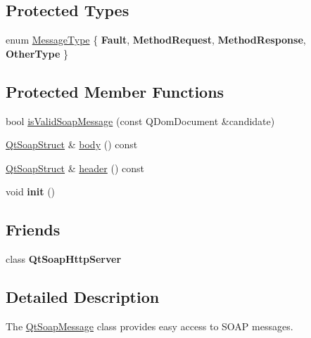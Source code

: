 \subsection*{Protected Types}
\begin{DoxyCompactItemize}
\item 
enum \mbox{\hyperlink{class_qt_soap_message_a57326237655d076b289452ce9ab3b8de}{Message\+Type}} \{ {\bfseries Fault}, 
{\bfseries Method\+Request}, 
{\bfseries Method\+Response}, 
{\bfseries Other\+Type}
 \}
\end{DoxyCompactItemize}
\subsection*{Protected Member Functions}
\begin{DoxyCompactItemize}
\item 
bool \mbox{\hyperlink{class_qt_soap_message_a2aa1fdeea09e733ac5fe103ece393b8a}{is\+Valid\+Soap\+Message}} (const Q\+Dom\+Document \&candidate)
\item 
\mbox{\hyperlink{class_qt_soap_struct}{Qt\+Soap\+Struct}} \& \mbox{\hyperlink{class_qt_soap_message_a8c5e1cc13af9a4aebfd6d061525a69f5}{body}} () const
\item 
\mbox{\hyperlink{class_qt_soap_struct}{Qt\+Soap\+Struct}} \& \mbox{\hyperlink{class_qt_soap_message_a4c1ec40db5502f9f54cadcafd4cdc772}{header}} () const
\item 
\mbox{\label{class_qt_soap_message_a7a10d5deccb30e6833870657825442d8}} 
void {\bfseries init} ()
\end{DoxyCompactItemize}
\subsection*{Friends}
\begin{DoxyCompactItemize}
\item 
\mbox{\label{class_qt_soap_message_abe59dec9580982274aa5d85dca246c29}} 
class {\bfseries Qt\+Soap\+Http\+Server}
\end{DoxyCompactItemize}


\subsection{Detailed Description}
The \mbox{\hyperlink{class_qt_soap_message}{Qt\+Soap\+Message}} class provides easy access to S\+O\+AP messages. 

